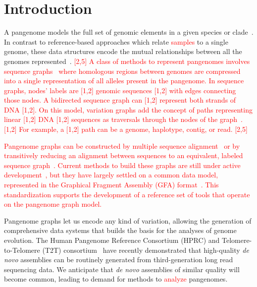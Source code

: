 \documentclass{bioinfo}
\newcommand{\REVIEWED}[1]{{\textcolor{Red}{#1}}}
\begin{document}
\section{Introduction}
A pangenome models the full set of genomic elements in a given species or clade~\REVIEWED{\citep{Tettelin_2008,cpang2018,Eizenga_2020}}.
In contrast to reference-based approaches which relate \REVIEWED{samples} to a single genome, these data structures encode the mutual relationships between all the genomes represented\REVIEWED{~\citep{Ballouz2019}}.
\REVIEWED{[2,5] A class of methods to represent pangenomes involves sequence graphs~\citep{Hein1989, Paten:2017} where homologous regions between genomes are compressed into a single representation of all alleles present in the pangenome.
In sequence graphs, nodes' labels are \REVIEWED{[1,2] genomic sequences [1,2]} with edges connecting those nodes.
A bidirected sequence graph can \REVIEWED{[1,2] represent both strands of DNA [1,2]}.
On this model, variation graphs add the concept of paths representing linear \REVIEWED{[1,2] DNA [1,2]} sequences as traversals through the nodes of the graph~\citep{Garrison:2018}. \REVIEWED{[1,2] For example, a [1,2]} path can be a genome, haplotype, contig, or read. [2,5]}

\REVIEWED{Pangenome graphs can be constructed by multiple sequence alignment~\citep{Lee_2002,Grasso_2004} or by transitively reducing an alignment between sequences to an equivalent, labeled sequence graph~\citep{Kehr_2014,Garrison_2019_thesis}.
Current methods to build these graphs are still under active development~\citep{Li:2020,Armstrong:2020,pggb}, but they have largely settled on a common data model, represented in the Graphical Fragment Assembly (GFA) format~\citep{GFA}.
This standardization supports the development of a reference set of tools that operate on the pangenome graph model.}

Pangenome graphs let us encode any kind of variation, allowing the generation of comprehensive data systems that builds the basis for the analyses of genome evolution.
The Human Pangenome Reference Consortium (HPRC) and Telomere-to-Telomere (T2T) consortium~\citep{Miga:2020, Logsdon_2021, Nurk_2021} have recently demonstrated that high-quality \textit{de novo} assemblies can be routinely generated from third-generation long read sequencing data.
We anticipate that \textit{de novo} assemblies of similar quality will become common, leading to demand for methods to \REVIEWED{analyze} pangenomes.
\end{document}
